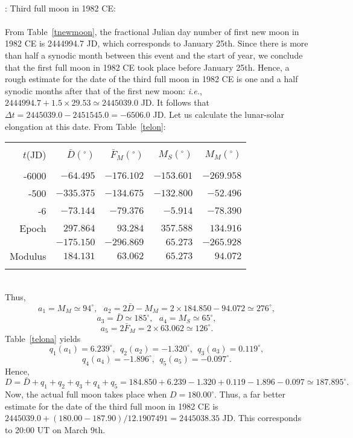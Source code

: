 ~\\
: Third full moon in 1982 CE:\\
~\\
From Table~\ref{tnewmoon}, the fractional Julian day number of first new moon in 1982 CE is 2444994.7 JD, which
corresponds to January 25th. Since there is more than half a synodic month between this event and the
start of year, we conclude that the first full moon in 1982 CE took place before January 25th.  Hence, a rough estimate for the
date of the third full moon in 1982 CE is one and a half synodic months after that of the first new moon: {\em i.e.}, $2444994.7
+ 1.5\times 29.53\simeq 2445039.0$ JD. It follows that $\Delta t = 2445039.0 -2451545.0=-6506.0$ JD. Let us calculate the lunar-solar elongation at
this date.
From Table~\ref{telon}:\\
\begin{tabular}{rrrrr}
&&&&\\
$t$(JD) & $ \bar{D}(^\circ)$ & $\bar{F}_M(^\circ)$ & $M_S(^\circ)$ & $M_M(^\circ)$\\[-2ex]
&&&&\\
-6000 & $-64.495$ & $-176.102$ & $-153.601$ & $-269.958$\\
-500 & $-335.375$ & $-134.675$ & $-132.800$ & $-52.496$\\
-6 & $-73.144$ & $-79.376$ & $-5.914$ & $-78.390$\\
Epoch & $297.864$ & $93.284$ & $357.588$ & $134.916$\\\cline{2-5}
&$-175.150$ & $-296.869$ & $65.273$ & $-265.928$\\\cline{2-5}
Modulus & $184.131$ & $63.062$ &$65.273$ & $94.072$\\ 
&&&\\
\end{tabular}\\
Thus,
$$
a_1=M_M\simeq 94^\circ,~~~a_2=2\bar{D}-M_M = 2\times 184.850-94.072\simeq 276^\circ,
$$ 
$$
a_3=\bar{D}\simeq 185^\circ,~~~a_4 = M_S\simeq 65^\circ,
$$ 
$$
a_5=2\bar{F}_M = 2\times 63.062\simeq 126^\circ.
$$
Table~\ref{telona} yields $$
q_1(a_1)=6.239^\circ,~~q_2(a_2)= -1.320^\circ,~~q_3(a_3) = 0.119^\circ,
$$
$$q_4(a_4)=-1.896^\circ,~~q_5(a_5)= -0.097^\circ.
$$
 Hence,
$$
D = \bar{D} + q_1+q_2+q_3+q_4+q_5=184.850+6.239-1.320+0.119-1.896-0.097\simeq
187.895^\circ.
$$
Now, the actual full moon  takes place when $D=180.00^\circ$. Thus, a far better estimate for the date 
of the third full moon in 1982 CE is $2445039.0 +(180.00-187.90)/12.1907491= 2445038.35$ JD.
This corresponds to 20:00  UT on March 9th.

